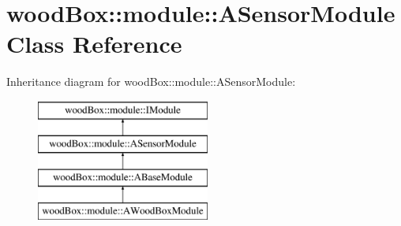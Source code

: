 \hypertarget{classwood_box_1_1module_1_1_a_sensor_module}{}\section{wood\+Box\+:\+:module\+:\+:A\+Sensor\+Module Class Reference}
\label{classwood_box_1_1module_1_1_a_sensor_module}
Inheritance diagram for wood\+Box\+:\+:module\+:\+:A\+Sensor\+Module\+:\begin{figure}[H]
\begin{center}
\leavevmode
\includegraphics[height=4.000000cm]{classwood_box_1_1module_1_1_a_sensor_module}
\end{center}
\end{figure}
